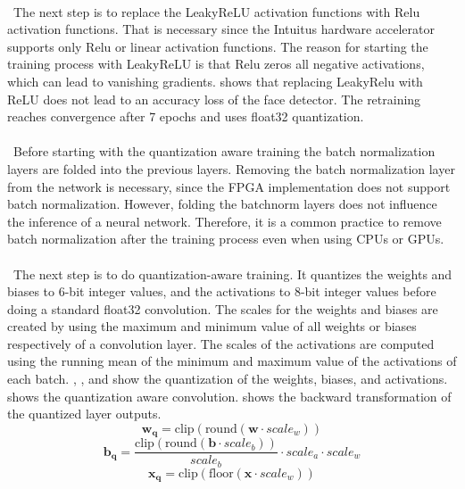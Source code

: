 \documentclass[%
a4paper,
twoside,
openany,
dvipsnames
]
{report}
\begin{document}
\\\
The next step is to replace the LeakyReLU activation functions with \gls{Relu} activation functions. That is necessary since the Intuitus hardware accelerator supports only \gls{Relu} or linear activation functions. The reason for starting the training process with LeakyReLU is that \gls{Relu} zeros all negative activations, which can lead to vanishing gradients.  shows that replacing LeakyRelu with ReLU does not lead to an accuracy loss of the face detector. The retraining reaches convergence after 7 epochs and uses float32 quantization. \\
\\\
Before starting with the quantization aware training the batch normalization layers are folded into the previous layers. Removing the batch normalization layer from the network is necessary, since the \gls{FPGA} implementation does not support batch normalization. However, folding the batchnorm layers does not influence the inference of a neural network. Therefore, it is a common practice to remove batch normalization after the training process even when using \glspl{CPU} or \glspl{GPU}.\\
\\\
The next step is to do quantization-aware training. It quantizes the weights and biases to 6-bit integer values, and the activations to 8-bit integer values before doing a standard float32 convolution. The scales for the weights and biases are created by using the maximum and minimum value of all weights or biases respectively of a convolution layer. The scales of the activations are computed using the running mean of the minimum and maximum value of the activations of each batch. , , and  show the quantization of the weights, biases, and activations.  shows the quantization aware convolution.  shows the backward transformation of the quantized layer outputs.   
\begin{equation} \label{eq:w-q}
	\mathbf{w_{q}} = \text{clip}(\text{round}(\mathbf{w} \cdot scale_w)) 
\end{equation}
\begin{equation} \label{eq:b-q}
	\mathbf{b_q} = \frac{\text{clip}(\text{round}(\mathbf{b} \cdot  scale_b))}{scale_b} \cdot scale_a \cdot scale_w 
\end{equation}
\begin{equation} \label{eq:x-q}
	\mathbf{x_q} = \text{clip}(\text{floor}(\mathbf{x} \cdot scale_w))
\end{equation}
\end{document}
